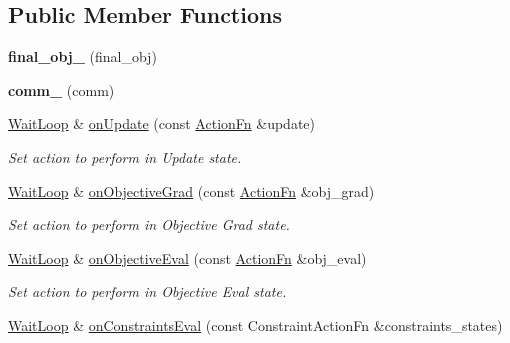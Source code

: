 \subsection*{Public Member Functions}
\begin{DoxyCompactItemize}
\item 
\hypertarget{classop_1_1WaitLoop_ab956a772dedd652f3ac4202fa79465e3}{{\bfseries final\-\_\-obj\-\_\-} (final\-\_\-obj)}\label{classop_1_1WaitLoop_ab956a772dedd652f3ac4202fa79465e3}

\item 
\hypertarget{classop_1_1WaitLoop_a964c8dcb4648f993cd5077fd2f3ddb5b}{{\bfseries comm\-\_\-} (comm)}\label{classop_1_1WaitLoop_a964c8dcb4648f993cd5077fd2f3ddb5b}

\item 
\hypertarget{classop_1_1WaitLoop_a907de1966578ce11ae28df8ae8ee776b}{\hyperlink{classop_1_1WaitLoop}{Wait\-Loop} \& \hyperlink{classop_1_1WaitLoop_a907de1966578ce11ae28df8ae8ee776b}{on\-Update} (const \hyperlink{namespaceop_af8b17abb60b9f5c60c0a6764d5aa1228}{Action\-Fn} \&update)}\label{classop_1_1WaitLoop_a907de1966578ce11ae28df8ae8ee776b}

\begin{DoxyCompactList}\small\item\em Set action to perform in Update state. \end{DoxyCompactList}\item 
\hypertarget{classop_1_1WaitLoop_ade829f1843983d3c283835a3f679a328}{\hyperlink{classop_1_1WaitLoop}{Wait\-Loop} \& \hyperlink{classop_1_1WaitLoop_ade829f1843983d3c283835a3f679a328}{on\-Objective\-Grad} (const \hyperlink{namespaceop_af8b17abb60b9f5c60c0a6764d5aa1228}{Action\-Fn} \&obj\-\_\-grad)}\label{classop_1_1WaitLoop_ade829f1843983d3c283835a3f679a328}

\begin{DoxyCompactList}\small\item\em Set action to perform in Objective Grad state. \end{DoxyCompactList}\item 
\hypertarget{classop_1_1WaitLoop_aafedafeb2d596a571608f76d2dbae2f9}{\hyperlink{classop_1_1WaitLoop}{Wait\-Loop} \& \hyperlink{classop_1_1WaitLoop_aafedafeb2d596a571608f76d2dbae2f9}{on\-Objective\-Eval} (const \hyperlink{namespaceop_af8b17abb60b9f5c60c0a6764d5aa1228}{Action\-Fn} \&obj\-\_\-eval)}\label{classop_1_1WaitLoop_aafedafeb2d596a571608f76d2dbae2f9}

\begin{DoxyCompactList}\small\item\em Set action to perform in Objective Eval state. \end{DoxyCompactList}\item 
\hypertarget{classop_1_1WaitLoop_aadebe2316999a2cfb9dc6dd25a23bf0e}{\hyperlink{classop_1_1WaitLoop}{Wait\-Loop} \& \hyperlink{classop_1_1WaitLoop_aadebe2316999a2cfb9dc6dd25a23bf0e}{on\-Constraints\-Eval} (const Constraint\-Action\-Fn \&constraints\-\_\-states)}\label{classop_1_1WaitLoop_aadebe2316999a2cfb9dc6dd25a23bf0e}


\end{DoxyCompactItemize}
